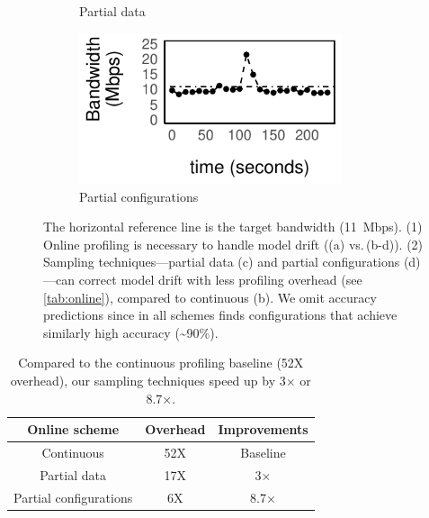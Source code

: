 \begin{figure}
\begin{subfigure}[t]{0.5\columnwidth}
    \caption{Partial data}
    \label{fig:online-partial}
  \end{subfigure}%
  \begin{subfigure}[t]{0.5\columnwidth}
    \centering
    \includegraphics[width=0.85\textwidth]{figures/online4.pdf}
    \caption{Partial configurations}
    \label{fig:online-trigger}
  \end{subfigure}
  \caption{The horizontal reference line is the target bandwidth
    (\SI{11}{Mbps}). (1) Online profiling is necessary to handle model drift
    ((a) vs.\,(b-d)). (2) Sampling techniques---partial data (c) and partial
    configurations (d)---can correct model drift with less profiling overhead
    (see \autoref{tab:online}), compared to continuous (b).  We omit accuracy
    predictions since in all schemes \awstream{} finds configurations that
    achieve similarly high accuracy (\textasciitilde 90\%).  }
  \label{fig:online-tricks}
\end{figure}

\begin{table}[t]
  \centering
  \begin{tabular}{c c c}
    \toprule
    Online scheme & Overhead & Improvements \\
    \midrule
    Continuous & 52X & Baseline \\
    Partial data & 17X & 3$\times$\\
    Partial configurations & 6X & 8.7$\times$ \\
    \bottomrule
  \end{tabular}
  \caption{Compared to the continuous profiling baseline (52X overhead), our
    sampling techniques speed up by 3$\times$ or 8.7$\times$.}
  \label{tab:online}
\end{table}


